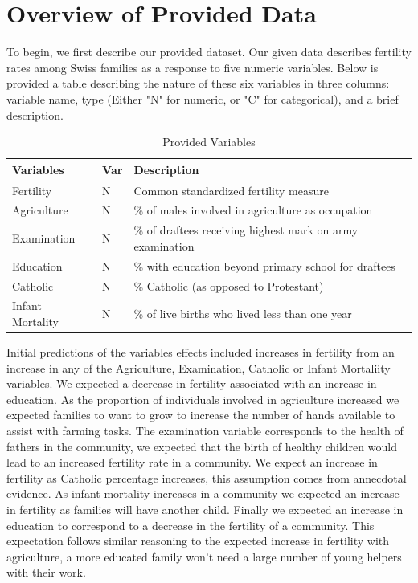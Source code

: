 \documentclass[preprint,12pt]{elsarticle}
\begin{document}

\section*{Overview of Provided Data}
\label{S:1}

To begin, we first describe our provided dataset. Our given data describes fertility rates among Swiss families as a response to five numeric variables. Below is provided a table describing the nature of these six variables in three columns: variable name, type (Either "N" for numeric, or "C" for categorical), and a brief description.

\begin{table}[h]
\centering
\begin{tabular}{l l l}
\hline
\textbf{Variables} & \textbf{Var} & \textbf{Description}\\
\hline
Fertility & N & Common standardized fertility measure \\
Agriculture & N & \% of males involved in agriculture as occupation \\
Examination & N & \% of draftees receiving highest mark on army examination \\
Education & N & \% with education beyond primary school for draftees \\
Catholic & N & \% Catholic (as opposed to Protestant) \\
Infant Mortality & N & \% of live births who lived less than one year \\
\hline
\end{tabular}
\caption{Provided Variables}
\end{table}

Initial predictions of the variables effects included increases in fertility from an increase in any of the Agriculture, Examination, Catholic or Infant Mortaliity variables. We expected a decrease in fertility associated with an increase in education. As the proportion of individuals involved in agriculture increased we expected families to want to grow to increase the number of hands available to assist with farming tasks. The examination variable corresponds to the health of fathers in the community, we expected that the birth of healthy children would lead to an increased fertility rate in a community. We expect an increase in fertility as Catholic percentage increases, this assumption comes from annecdotal evidence. As infant mortality increases in a community we expected an increase in fertility as families will have another child. Finally we expected an increase in education to correspond to a decrease in the fertility of a community. This expectation follows similar reasoning to the expected increase in fertility with agriculture, a more educated family won't need a large number of young helpers with their work.\\
\end{document}
